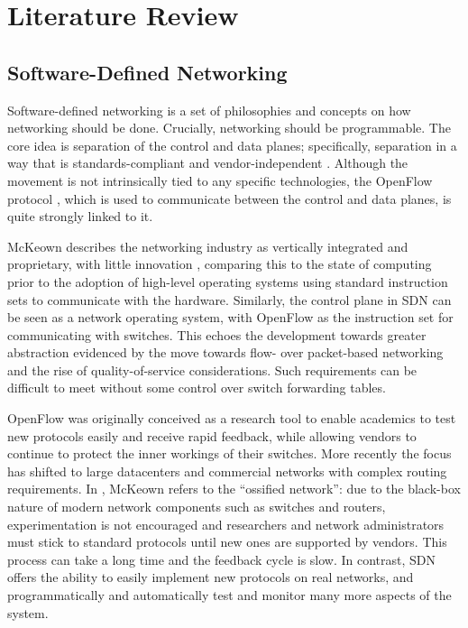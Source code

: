 \chapter{Literature Review}

\section{Software-Defined Networking}
Software-defined networking is a set of philosophies and concepts on how networking should be done. Crucially, networking should be programmable. The core idea is separation of the control and data planes; specifically, separation in a way that is standards-compliant and vendor-independent \cite{onf:sdn}. Although the movement is not intrinsically tied to any specific technologies, the OpenFlow protocol \cite{onf:switch140}, which is used to communicate between the control and data planes, is quite strongly linked to it.

McKeown describes the networking industry as vertically integrated and proprietary, with little innovation \cite{mckeown:sdn}, comparing this to the state of computing prior to the adoption of high-level operating systems using standard instruction sets to communicate with the hardware. Similarly, the control plane in SDN can be seen as a network operating system, with OpenFlow as the instruction set for communicating with switches. This echoes the development towards greater abstraction evidenced by the move towards flow- over packet-based networking and the rise of quality-of-service considerations. Such requirements can be difficult to meet without some control over switch forwarding tables.

OpenFlow was originally conceived \cite{mckeown:openflow} as a research tool to enable academics to test new protocols easily and receive rapid feedback, while allowing vendors to continue to protect the inner workings of their switches. More recently \cite{onf:sdn} the focus has shifted to large datacenters and commercial networks with complex routing requirements. In \cite{mckeown:sdn}, McKeown refers to the  ``ossified network'': due to the black-box nature of modern network components such as switches and routers, experimentation is not encouraged and researchers and network administrators must stick to standard protocols until new ones are supported by vendors. This process can take a long time and the feedback cycle is slow. In contrast, SDN offers the ability to easily implement new protocols on real networks, and programmatically and automatically test and monitor many more aspects of the system.

